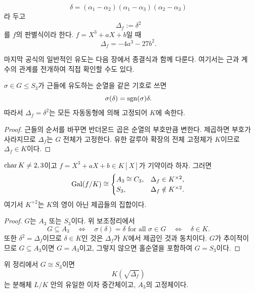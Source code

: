 \begin{definition}
\[
  \delta=(\alpha_1-\alpha_2)(\alpha_1-\alpha_3)(\alpha_2-\alpha_3)
\]
라 두고
\[
  \Delta_f:=\delta^2
\]
를 $f$의 판별식이라 한다. $f=X^3+aX+b$일 때
\[
  \Delta_f=-4a^3-27b^2.
\]
\end{definition}

마지막 공식의 일반적인 유도는 다음 장에서 종결식과 함께 다룬다. 여기서는 근과 계수의 관계를 전개하여 직접 확인할 수도 있다.

\begin{lemma}[교대곱의 변환]
$\sigma\in G\le S_3$가 근들에 유도하는 순열을 같은 기호로 쓰면
\[
  \sigma(\delta)=\operatorname{sgn}(\sigma)\delta.
\]
따라서 $\Delta_f=\delta^2$는 모든 자동동형에 의해 고정되어 $K$에 속한다.
\end{lemma}

\begin{proof}
근들의 순서를 바꾸면 반더몬드 곱은 순열의 부호만큼 변한다. 제곱하면 부호가 사라지므로 $\Delta_f$는 $G$ 전체가 고정한다. 유한 갈루아 확장의 전체 고정체가 $K$이므로 $\Delta_f\in K$이다.
\end{proof}

\begin{theorem}
$\operatorname{char} K\ne2,3$이고 $f=X^3+aX+b\in K[X]$가 기약이라 하자. 그러면
\[
  \operatorname{Gal}(f/K)\cong
  \begin{cases}
    A_3\cong C_3,& \Delta_f\in K^{\times2},\\
    S_3,& \Delta_f\notin K^{\times2}.
  \end{cases}
\]
여기서 $K^{\times2}$는 $K$의 영이 아닌 제곱들의 집합이다.
\end{theorem}

\begin{proof}
$G$는 $A_3$ 또는 $S_3$이다. 위 보조정리에서
\[
  G\subseteq A_3
  \quad\Longleftrightarrow\quad
  \sigma(\delta)=\delta\text{ for all }\sigma\in G
  \quad\Longleftrightarrow\quad
  \delta\in K.
\]
또한 $\delta^2=\Delta_f$이므로 $\delta\in K$인 것은 $\Delta_f$가 $K$에서 제곱인 것과 동치이다. $G$가 추이적이므로 $G\subseteq A_3$이면 $G=A_3$이고, 그렇지 않으면 홀순열을 포함하여 $G=S_3$이다.
\end{proof}

\begin{corollary}
위 정리에서 $G\cong S_3$이면
\[
  K(\sqrt{\Delta_f})
\]
는 분해체 $L/K$ 안의 유일한 이차 중간체이고, $A_3$의 고정체이다.
\end{corollary}

